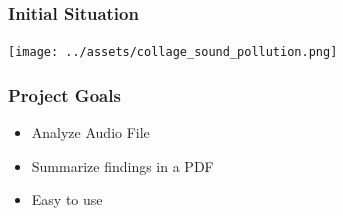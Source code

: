 \begin{frame}
    \frametitle{Initial Situation}
    \centering
    \texttt{[image: ../assets/collage\_sound\_pollution.png]}
\end{frame}

\begin{frame}
    \frametitle{Project Goals}
    \begin{itemize}[<+->]
        \large
        \item Analyze Audio File
        \item Summarize findings in a PDF
        \item Easy to use
    \end{itemize}
\end{frame}

